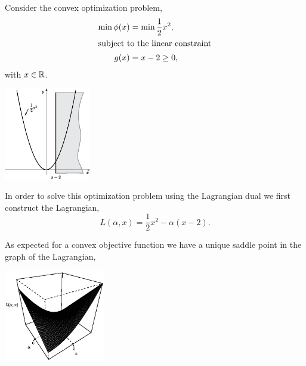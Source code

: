 \documentclass[a4paper,blends,pdf,colorBG,slideColor]{prosper}
\begin{document}
\es


\small
Consider the convex optimization problem, 
\begin{align*}
\min \phi(x) &= \min \frac{1}{2} x^2,\\
\intertext{subject to the linear constraint}
g(x)& = x - 2 \ge 0,
\end{align*}
with $x \in \mathbb{R}$.

\begin{center}
\includegraphics[height=40mm]{figures/fig07-01.eps}
\end{center}
\es


In order to solve this optimization problem using the Lagrangian dual we first construct the Lagrangian,
\begin{equation*}
\label{eq:simple-lagranian-opt}
L(\alpha,x)  = \frac{1}{2}x^2 - \alpha(x - 2).
\end{equation*}

As expected for a convex objective function we have a unique saddle point in the graph of the Lagrangian,  

\begin{center}
\includegraphics[height=40mm]{figures/fig07-02.eps}
\end{center}
\es
\end{document}
